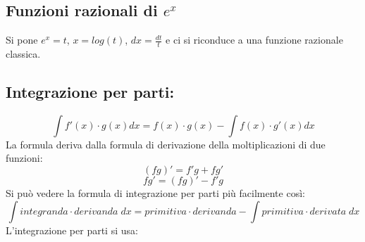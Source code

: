 \subsection{Funzioni razionali di $e^x$}
Si pone $e^x = t$, $x= log(t)$, $dx = \frac{dt}{t}$ e ci si riconduce a una funzione razionale classica.
\subsection{Integrazione per parti:}
\[
    \int f'(x) \cdot  g(x) dx = f(x) \cdot g(x) - \int f(x) \cdot g'(x)dx
\]
La formula deriva dalla formula di derivazione della moltiplicazioni di due funzioni:
\[
    (fg)' = f'g + fg'
\]
\[
    fg' = (fg)' - f'g
\]
Si può vedere la formula di integrazione per parti più facilmente così:
\[
    \int integranda \cdot derivanda \; dx = primitiva \cdot derivanda - \int primitiva \cdot derivata \; dx
\]
L'integrazione per parti si usa:
